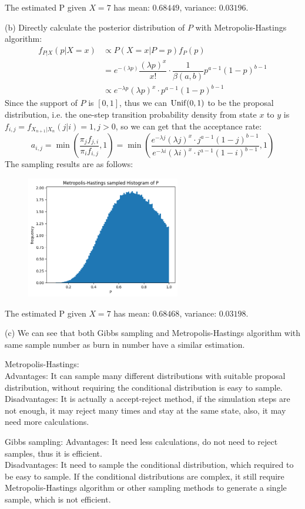 \begin{homeworkProblem}
The estimated P given $X = 7$ has mean: $0.68449$, variance: $0.03196$.

(b) Directly calculate the posterior distribution of $P$ with Metropolis-Hastings algorithm:
\begin{align*}
f_{P|X}(p|X=x) &\propto P(X=x|P=p)f_P(p) \\
&= e^{-(\lambda p)}\dfrac{(\lambda p)^x}{x!} \cdot \dfrac{1}{\beta(a,b)}p^{a-1}(1-p)^{b-1} \\
&\propto e^{-\lambda p}(\lambda p)^x\cdot p^{a-1}(1-p)^{b-1}
\end{align*}
Since the support of $P$ is $[0,1]$, thus we can $\operatorname{Unif}(0,1)$ to be the proposal distribution, i.e. the one-step transition probability density from state $x$ to $y$ is $f_{i,j}=f_{X_{n+1}|X_n}(j|i)=1,j>0$, so we can get that the acceptance rate:
$$a_{i,j}=\min\left(\dfrac{\pi_jf_{j,i}}{\pi_if_{i,j}},1\right)=\min\left(\dfrac{e^{-\lambda j}(\lambda j)^x\cdot j^{a-1}(1-j)^{b-1}}{e^{-\lambda i}(\lambda i)^x\cdot i^{a-1}(1-i)^{b-1}},1\right)$$
The sampling results are as follows:
\begin{figure}[h]
    \centering
    \includegraphics[width=0.6\textwidth]{./figure/p8/MH_P.png}
\end{figure}
The estimated P given $X = 7$ has mean: $0.68468$, variance: $0.03198$.

(c) We can see that both Gibbs sampling and Metropolis-Hastings algorithm with same sample number as burn in number have a similar estimation.

Metropolis-Hastings: \\
Advantages: It can sample many different distributions with suitable proposal distribution, without requiring the conditional distribution is easy to sample. \\
Disadvantages: It is actually a accept-reject method, if the simulation steps are not enough, it may reject many times and stay at the same state, also, it may need more calculations.


Gibbs sampling:
Advantages: It need less calculations, do not need to reject samples, thus it is efficient. \\
Disadvantages: It need to sample the conditional distribution, which required to be easy to sample. If the conditional distributions are complex, it still require Metropolis-Hastings algorithm or other sampling methods to generate a single sample, which is not efficient.

\end{homeworkProblem}

\newpage